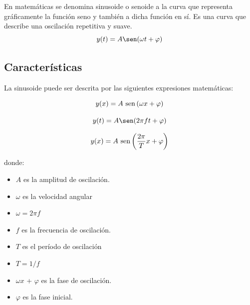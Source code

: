 \documentclass[]{article}
\begin{document}
En matemáticas se denomina sinusoide o senoide a la curva que representa gráficamente la función seno y también a dicha función en sí. Es una curva que describe una oscilación repetitiva y suave.\\


\begin{equation}
y(t) = A\sen(\omega t + \varphi)
\end{equation}


\subsection{Características}

La sinusoide puede ser descrita por las siguientes expresiones matemáticas:




\begin{equation}
y(x) = A\ {\rm{sen}}\left (\omega x + \varphi \right )
\end{equation}

\begin{equation}
y(t) = A\sen(2 \pi f t + \varphi)
\end{equation}

\begin{equation}
y(x) = A\ {\rm{sen}} \left (\frac {2\pi }{T}x + \varphi \right )
\end{equation}


donde:\\

\begin{itemize}
	\item $A$ es la amplitud de oscilación.
	\item $\omega$ es la velocidad angular  \item $\omega = 2\pi f$
	\item $f$ es la frecuencia de oscilación.
	\item $T$ es el período de oscilación  \item  $T = {1}/{f}$
	\item $\omega x$ + $\varphi$ es la fase de oscilación.
	\item $\varphi$ es la fase inicial.
\end{itemize}
\end{document}
